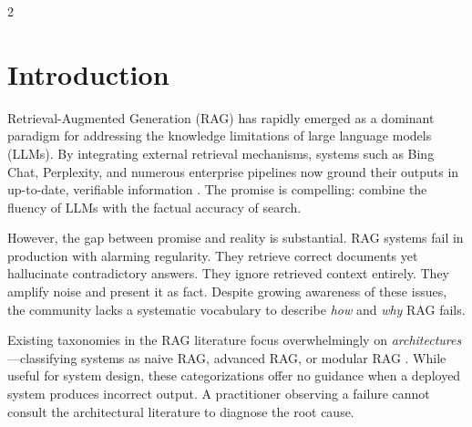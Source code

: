 \documentclass[11pt,a4paper]{article}
\begin{document}
\begin{multicols}{2}
\section{Introduction}

Retrieval-Augmented Generation (RAG) has rapidly emerged as a dominant paradigm for addressing the knowledge limitations of large language models (LLMs). By integrating external retrieval mechanisms, systems such as Bing Chat, Perplexity, and numerous enterprise pipelines now ground their outputs in up-to-date, verifiable information \cite{lewis2020rag}. The promise is compelling: combine the fluency of LLMs with the factual accuracy of search.

However, the gap between promise and reality is substantial. RAG systems fail in production with alarming regularity. They retrieve correct documents yet hallucinate contradictory answers. They ignore retrieved context entirely. They amplify noise and present it as fact. Despite growing awareness of these issues, the community lacks a systematic vocabulary to describe \textit{how} and \textit{why} RAG fails.

Existing taxonomies in the RAG literature focus overwhelmingly on \textit{architectures}---classifying systems as naive RAG, advanced RAG, or modular RAG \cite{gao2023ragsurvey}. While useful for system design, these categorizations offer no guidance when a deployed system produces incorrect output. A practitioner observing a failure cannot consult the architectural literature to diagnose the root cause.


\end{multicols}
\end{document}
